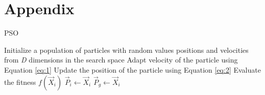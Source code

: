 \chapter{Appendix}

\begin{algorithm}
	\caption{PSO}
	\label{pseudoPSO}
	\begin{algorithmic}[1]
		\State Initialize a population of particles with random values positions
		and velocities from \textit{D} dimensions in the search space
		\State Adapt velocity of the particle using Equation \ref{eq:1}
		\State Update the position of the particle using Equation \ref{eq:2}
		\State Evaluate the fitness {$f(\overrightarrow{X}_i)$}
		\State $\overrightarrow{P}_i \gets \overrightarrow{X}_i$
		\EndIf
		\State $\overrightarrow{P}_g \gets \overrightarrow{X}_i$
		\EndIf
		\EndFor
		\EndWhile
	\end{algorithmic}
\end{algorithm}
